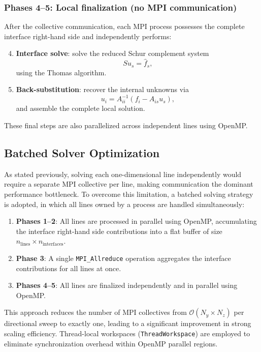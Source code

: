\documentclass[12pt]{article}
\begin{document}
\subsubsection{Phases 4--5: Local finalization (no MPI communication)}

After the collective communication, each MPI process possesses the complete interface right-hand side and independently performs:
\begin{enumerate}
    \setcounter{enumi}{3}
    \item \textbf{Interface solve}: solve the reduced Schur complement system
    \[
        S u_s = \hat{f}_s,
    \]
    using the Thomas algorithm.
    \item \textbf{Back-substitution}: recover the internal unknowns via
    \[
        u_i = A_{ii}^{-1}(f_i - A_{is} u_s),
    \]
    and assemble the complete local solution.
\end{enumerate}

These final steps are also parallelized across independent lines using OpenMP.
\subsection{Batched Solver Optimization}

As stated previously, solving each one-dimensional line independently would require a separate MPI collective per line, making communication the dominant performance bottleneck. To overcome this limitation, a batched solving strategy is adopted, in which all lines owned by a process are handled simultaneously:

\begin{enumerate}
    \item \textbf{Phases 1--2}: All lines are processed in parallel using OpenMP, accumulating the interface right-hand side contributions into a flat buffer of size $n_{\text{lines}} \times n_{\text{interfaces}}$.
    
    \item \textbf{Phase 3}: A single \texttt{MPI\_Allreduce} operation aggregates the interface contributions for all lines at once.
    
    \item \textbf{Phases 4--5}: All lines are finalized independently and in parallel using OpenMP.
\end{enumerate}

This approach reduces the number of MPI collectives from $\mathcal{O}(N_y \times N_z)$ per directional sweep to exactly one, leading to a significant improvement in strong scaling efficiency. Thread-local workspaces (\texttt{ThreadWorkspace}) are employed to eliminate synchronization overhead within OpenMP parallel regions.
\end{document}
